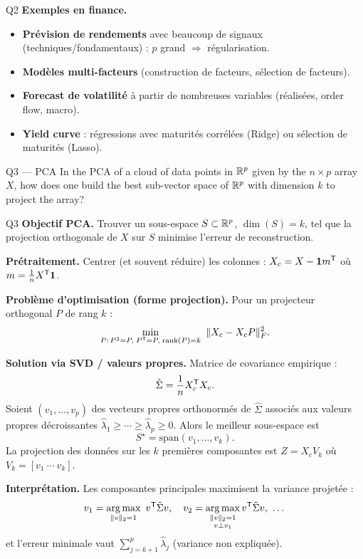 \begin{solutionbox}{Q2}
\medskip
\textbf{Exemples en finance.}
\begin{itemize}[leftmargin=*]
  \item \textbf{Prévision de rendements} avec beaucoup de signaux (techniques/fondamentaux) : $p$ grand $\Rightarrow$ régularisation.
  \item \textbf{Modèles multi-facteurs} (construction de facteurs, sélection de facteurs).
  \item \textbf{Forecast de volatilité} à partir de nombreuses variables (réalisées, order flow, macro).
  \item \textbf{Yield curve} : régressions avec maturités corrélées (Ridge) ou sélection de maturités (Lasso).
\end{itemize}
\end{solutionbox}

\begin{questionbox}{Q3 --- PCA}
In the PCA of a cloud of data points in $\mathbb{R}^p$ given by the $n\times p$ array $X$, how does one build the best sub-vector space of $\mathbb{R}^p$ with dimension $k$ to project the array?
\end{questionbox}

\begin{solutionbox}{Q3}
\textbf{Objectif PCA.} Trouver un sous-espace $S\subset\mathbb{R}^p$, $\dim(S)=k$, tel que la projection orthogonale de $X$ sur $S$ minimise l'erreur de reconstruction.

\medskip
\textbf{Prétraitement.} Centrer (et souvent réduire) les colonnes : $X_c = X - \mathbf{1} m^{\mathsf{T}}$ où $m=\frac1n X^{\mathsf{T}} \mathbf{1}$.

\medskip
\textbf{Problème d'optimisation (forme projection).} Pour un projecteur orthogonal $P$ de rang $k$ :
\[
\min_{P:\,P^2=P,\;P^\trans=P,\;\mathrm{rank}(P)=k}\ \|X_c - X_c P\|_F^2.
\]

\medskip
\textbf{Solution via SVD / valeurs propres.} Matrice de covariance empirique :
\[
\hat\Sigma=\frac1n X_c^{\mathsf{T}} X_c.
\]
Soient $(v_1,\dots,v_p)$ des vecteurs propres orthonormés de $\hat\Sigma$ associés aux valeurs propres décroissantes $\hat\lambda_1\ge\cdots\ge\hat\lambda_p\ge 0$.
Alors le meilleur sous-espace est
\[
S^\star=\mathrm{span}(v_1,\dots,v_k).
\]
La projection des données sur les $k$ premières composantes est $Z = X_c V_k$ où $V_k=[v_1\ \cdots\ v_k]$.

\medskip
\textbf{Interprétation.} Les composantes principales maximisent la variance projetée :
\[
v_1=\argmax_{\|v\|_2=1}\ v^\trans \hat\Sigma v,\quad
v_2=\argmax_{\substack{\|v\|_2=1\\ v\perp v_1}} v^\trans \hat\Sigma v,\ \dots
\]
et l'erreur minimale vaut $\sum_{j=k+1}^p \hat\lambda_j$ (variance non expliquée).
\end{solutionbox}

